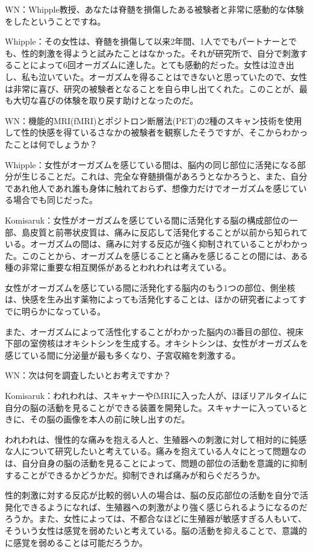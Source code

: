 WN：Whipple教授、あなたは脊髄を損傷したある被験者と非常に感動的な体験をしたということですね。

Whipple：その女性は、脊髄を損傷して以来2年間、1人ででもパートナーとでも、性的刺激を得ようと試みたことはなかった。それが研究所で、自分で刺激することによって6回オーガズムに達した。とても感動的だった。女性は泣き出し、私も泣いていた。オーガズムを得ることはできないと思っていたので、女性は非常に喜び、研究の被験者となることを自ら申し出てくれた。このことが、最も大切な喜びの体験を取り戻す助けとなったのだ。

WN：機能的MRI(fMRI)とポジトロン断層法(PET)の2種のスキャン技術を使用して性的快感を得ているさなかの被験者を観察したそうですが、そこからわかったことは何でしょうか？

Whipple：女性がオーガズムを感じている間は、脳内の同じ部位に活発になる部分が生じることだ。これは、完全な脊髄損傷があろうとなかろうと、また、自分であれ他人であれ誰も身体に触れておらず、想像力だけでオーガズムを感じている場合でも同じだった。

Komisaruk：女性がオーガズムを感じている間に活発化する脳の構成部位の一部、島皮質と前帯状皮質は、痛みに反応して活発化することが以前から知られている。オーガズムの間は、痛みに対する反応が強く抑制されていることがわかった。このことから、オーガズムを感じることと痛みを感じることの間には、ある種の非常に重要な相互関係があるとわれわれは考えている。

女性がオーガズムを感じている間に活発化する脳内のもう1つの部位、側坐核は、快感を生み出す薬物によっても活発化することは、ほかの研究者によってすでに明らかになっている。

また、オーガズムによって活性化することがわかった脳内の3番目の部位、視床下部の室傍核はオキシトシンを生成する。オキシトシンは、女性がオーガズムを感じている間に分泌量が最も多くなり、子宮収縮を刺激する。

WN：次は何を調査したいとお考えですか？

Komisaruk：われわれは、スキャナーやfMRIに入った人が、ほぼリアルタイムに自分の脳の活動を見ることができる装置を開発した。スキャナーに入っているときに、その脳の画像を本人の前に映し出すのだ。

われわれは、慢性的な痛みを抱える人と、生殖器への刺激に対して相対的に鈍感な人について研究したいと考えている。痛みを抱えている人々にとって問題なのは、自分自身の脳の活動を見ることによって、問題の部位の活動を意識的に抑制することができるかどうかだ。抑制できれば痛みが和らぐだろうか。

性的刺激に対する反応が比較的弱い人の場合は、脳の反応部位の活動を自分で活発化できるようになれば、生殖器への刺激がより強く感じられるようになるのだろうか。また、女性によっては、不都合なほどに生殖器が敏感すぎる人もいて、そういう女性は感覚を弱めたいと考えている。脳の活動を抑えることで、意識的に感覚を弱めることは可能だろうか。

